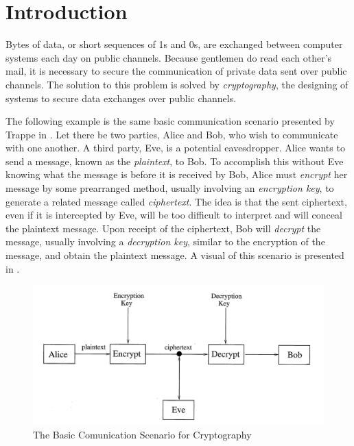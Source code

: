 \section{Introduction}

\par Bytes of data, or short sequences of 1s and 0s, are exchanged between
computer systems each day on public channels.
Because gentlemen do read each other's mail, it is necessary to secure the
communication of private data sent over public channels. The solution to this
problem is solved by {\em cryptography}, the designing of systems to secure
data exchanges over public channels.

\par The following example is the same basic communication scenario presented
by Trappe in \cite{bk:tw06}.
Let there be two parties, Alice and Bob, who wish to communicate with one another.
A third party, Eve, is a potential eavesdropper. Alice wants to send a message,
known as the {\em plaintext}, to Bob. To accomplish this without Eve knowing
what the message is before it is received by Bob, Alice must {\em encrypt} her message
by some prearranged method, usually involving an {\em encryption key}, to generate
a related message called {\em ciphertext}. The idea is that the sent ciphertext,
even if it is intercepted by Eve, will be too difficult to interpret and will conceal the
plaintext message. Upon receipt of the ciphertext, Bob will {\em decrypt} the message,
usually involving a {\em decryption key}, similar to the encryption of the message,
and obtain the plaintext message. A visual of this scenario is presented in \cite{fig:basic-scenario}.

\begin{figure}[h!]\label{fig:basic-scenario}
	\centering
		\includegraphics[width=120mm]{figs/basic-scenario.png}
		\caption{The Basic Comunication Scenario for Cryptography \cite{bk:tw06}}
\end{figure}

